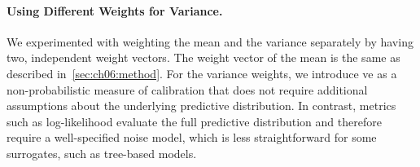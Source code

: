\paragraph{Using Different Weights for Variance.}
\label{sec:ch06:with_variance}
We experimented with weighting the mean and the variance separately by having two, independent weight vectors.
The weight vector of the mean is the same as described in~\cref{sec:ch06:method}.
For the variance weights,
we introduce \gls{ve} as a non-probabilistic measure of calibration that does not require additional assumptions about the underlying predictive distribution. In contrast, metrics such as log-likelihood evaluate the full predictive distribution and therefore require a well-specified noise model, which is less straightforward for some surrogates, such as tree-based models.

